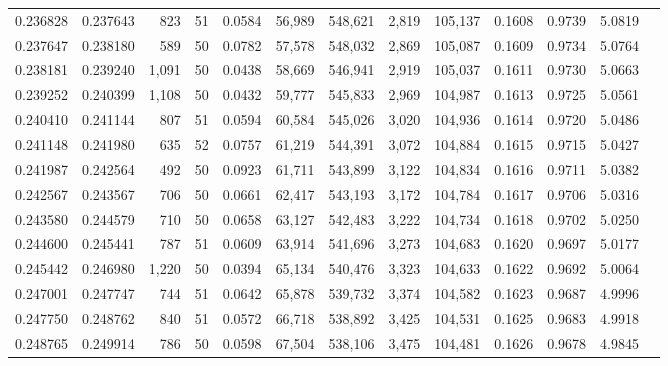 \begin{tabular}{rrrrrrrrrrrrr}
0.236828 & 0.237643 &   823 &  51 &                                     0.0584 &  56,989 & 548,621 &   2,819 & 105,137 & 0.1608 & 0.9739 & 5.0819 \\
0.237647 & 0.238180 &   589 &  50 &                                     0.0782 &  57,578 & 548,032 &   2,869 & 105,087 & 0.1609 & 0.9734 & 5.0764 \\
0.238181 & 0.239240 & 1,091 &  50 &                                     0.0438 &  58,669 & 546,941 &   2,919 & 105,037 & 0.1611 & 0.9730 & 5.0663 \\
0.239252 & 0.240399 & 1,108 &  50 &                                     0.0432 &  59,777 & 545,833 &   2,969 & 104,987 & 0.1613 & 0.9725 & 5.0561 \\
0.240410 & 0.241144 &   807 &  51 &                                     0.0594 &  60,584 & 545,026 &   3,020 & 104,936 & 0.1614 & 0.9720 & 5.0486 \\
0.241148 & 0.241980 &   635 &  52 &                                     0.0757 &  61,219 & 544,391 &   3,072 & 104,884 & 0.1615 & 0.9715 & 5.0427 \\
0.241987 & 0.242564 &   492 &  50 &                                     0.0923 &  61,711 & 543,899 &   3,122 & 104,834 & 0.1616 & 0.9711 & 5.0382 \\
0.242567 & 0.243567 &   706 &  50 &                                     0.0661 &  62,417 & 543,193 &   3,172 & 104,784 & 0.1617 & 0.9706 & 5.0316 \\
0.243580 & 0.244579 &   710 &  50 &                                     0.0658 &  63,127 & 542,483 &   3,222 & 104,734 & 0.1618 & 0.9702 & 5.0250 \\
0.244600 & 0.245441 &   787 &  51 &                                     0.0609 &  63,914 & 541,696 &   3,273 & 104,683 & 0.1620 & 0.9697 & 5.0177 \\
0.245442 & 0.246980 & 1,220 &  50 &                                     0.0394 &  65,134 & 540,476 &   3,323 & 104,633 & 0.1622 & 0.9692 & 5.0064 \\
0.247001 & 0.247747 &   744 &  51 &                                     0.0642 &  65,878 & 539,732 &   3,374 & 104,582 & 0.1623 & 0.9687 & 4.9996 \\
0.247750 & 0.248762 &   840 &  51 &                                     0.0572 &  66,718 & 538,892 &   3,425 & 104,531 & 0.1625 & 0.9683 & 4.9918 \\
0.248765 & 0.249914 &   786 &  50 &                                     0.0598 &  67,504 & 538,106 &   3,475 & 104,481 & 0.1626 & 0.9678 & 4.9845 \\

\end{tabular}
